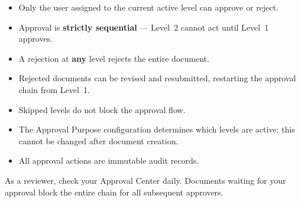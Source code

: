 \begin{itemize}[leftmargin=18pt]
  \item Only the user assigned to the current active level
        can approve or reject.
  \item Approval is \textbf{strictly sequential} --- Level~2
        cannot act until Level~1 approves.
  \item A rejection at \textbf{any} level rejects the entire
        document.
  \item Rejected documents can be revised and resubmitted,
        restarting the approval chain from Level~1.
  \item Skipped levels do not block the approval flow.
  \item The Approval Purpose configuration determines which
        levels are active; this cannot be changed after
        document creation.
  \item All approval actions are immutable audit records.
\end{itemize}

\begin{ugTip}
  As a reviewer, check your Approval Center daily. Documents
  waiting for your approval block the entire chain for all
  subsequent approvers.
\end{ugTip}

\newpage
